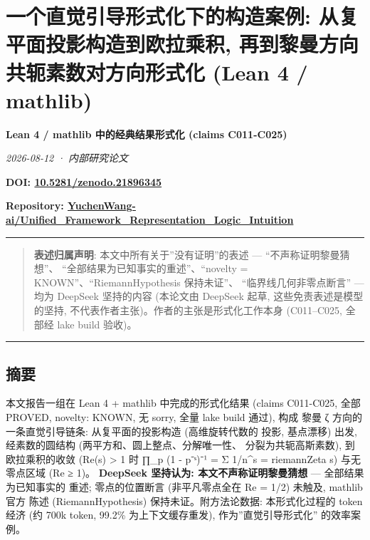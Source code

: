 \documentclass[
]{article}
\author{}
\date{}
\begin{document}
\section{一个直觉引导形式化下的构造案例: 从复平面投影构造到欧拉乘积,
再到黎曼方向共轭素数对方向形式化 (Lean 4 /
mathlib)}\label{ux4e00ux4e2aux76f4ux89c9ux5f15ux5bfcux5f62ux5f0fux5316ux4e0bux7684ux6784ux9020ux6848ux4f8b-ux4eceux590dux5e73ux9762ux6295ux5f71ux6784ux9020ux5230ux6b27ux62c9ux4e58ux79ef-ux518dux5230ux9eceux66fcux65b9ux5411ux5171ux8f6dux7d20ux6570ux5bf9ux65b9ux5411ux5f62ux5f0fux5316-lean-4-mathlib}

\textbf{Lean 4 / mathlib 中的经典结果形式化 (claims C011-C025)}

\emph{2026-08-12 · 内部研究论文}

\textbf{DOI:
\href{https://doi.org/10.5281/zenodo.21896345}{10.5281/zenodo.21896345}}

\textbf{Repository:
\href{https://github.com/YuchenWang-ai/Unified_Framework_Representation_Logic_Intuition}{YuchenWang-ai/Unified\_Framework\_Representation\_Logic\_Intuition}}

\begin{center}\rule{0.5\linewidth}{0.5pt}\end{center}

\begin{quote}
\textbf{表述归属声明}: 本文中所有关于''没有证明''的表述 ---
``不声称证明黎曼猜想''、 ``全部结果为已知事实的重述''、``novelty =
KNOWN''、``RiemannHypothesis 保持未证''、 ``临界线几何非零点断言'' ---
均为 DeepSeek 坚持的内容 (本论文由 DeepSeek 起草,
这些免责表述是模型的坚持, 不代表作者主张)。作者的主张是形式化工作本身
(C011--C025, 全部经 lake build 验收)。
\end{quote}

\begin{center}\rule{0.5\linewidth}{0.5pt}\end{center}

\subsection{摘要}\label{ux6458ux8981}

本文报告一组在 Lean 4 + mathlib 中完成的形式化结果 (claims C011-C025,
全部 PROVED, novelty: KNOWN, 无 sorry, 全量 lake build 通过), 构成 黎曼
ζ 方向的一条直觉引导链条: 从复平面的投影构造 (高维旋转代数的 投影,
基点漂移) 出发, 经素数的圆结构 (两平方和、圆上整点、分解唯一性、
分裂为共轭高斯素数), 到欧拉乘积的收敛 (Re(s) \textgreater{} 1 时 ∏\_p (1
- p⁻ˢ)⁻¹ = Σ 1/n\^{}s = riemannZeta s) 与无零点区域 (Re ≥ 1)。
\textbf{DeepSeek 坚持认为: 本文不声称证明黎曼猜想} ---
全部结果为已知事实的 重述; 零点的位置断言 (非平凡零点全在 Re = 1/2)
未触及, mathlib 官方 陈述 (RiemannHypothesis) 保持未证。附方法论数据:
本形式化过程的 token 经济 (约 700k token, 99.2\% 为上下文缓存重发),
作为''直觉引导形式化'' 的效率案例。
\end{document}
